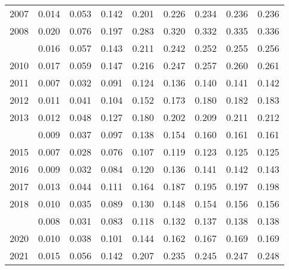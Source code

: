 \documentclass[
]{article}
\begin{document}
\begin{longtable}[t]{lrrrrrrrr}
2007 & 0.014 & 0.053 & 0.142 & 0.201 & 0.226 & 0.234 & 0.236 & 0.236\\
2008 & 0.020 & 0.076 & 0.197 & 0.283 & 0.320 & 0.332 & 0.335 & 0.336\\
\addlinespace
2009 & 0.016 & 0.057 & 0.143 & 0.211 & 0.242 & 0.252 & 0.255 & 0.256\\
2010 & 0.017 & 0.059 & 0.147 & 0.216 & 0.247 & 0.257 & 0.260 & 0.261\\
2011 & 0.007 & 0.032 & 0.091 & 0.124 & 0.136 & 0.140 & 0.141 & 0.142\\
2012 & 0.011 & 0.041 & 0.104 & 0.152 & 0.173 & 0.180 & 0.182 & 0.183\\
2013 & 0.012 & 0.048 & 0.127 & 0.180 & 0.202 & 0.209 & 0.211 & 0.212\\
\addlinespace
2014 & 0.009 & 0.037 & 0.097 & 0.138 & 0.154 & 0.160 & 0.161 & 0.161\\
2015 & 0.007 & 0.028 & 0.076 & 0.107 & 0.119 & 0.123 & 0.125 & 0.125\\
2016 & 0.009 & 0.032 & 0.084 & 0.120 & 0.136 & 0.141 & 0.142 & 0.143\\
2017 & 0.013 & 0.044 & 0.111 & 0.164 & 0.187 & 0.195 & 0.197 & 0.198\\
2018 & 0.010 & 0.035 & 0.089 & 0.130 & 0.148 & 0.154 & 0.156 & 0.156\\
\addlinespace
2019 & 0.008 & 0.031 & 0.083 & 0.118 & 0.132 & 0.137 & 0.138 & 0.138\\
2020 & 0.010 & 0.038 & 0.101 & 0.144 & 0.162 & 0.167 & 0.169 & 0.169\\
2021 & 0.015 & 0.056 & 0.142 & 0.207 & 0.235 & 0.245 & 0.247 & 0.248\\*
\end{longtable}
\end{document}
